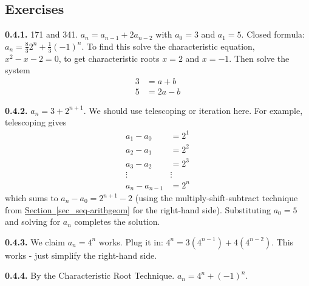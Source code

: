 \documentclass[12pt,]{book}
\theoremstyle{plain}
\theoremstyle{definition}
\theoremstyle{definition}
\theoremstyle{definition}
\numberwithin{equation}{chapter}
\newcommand{\amp}{&}
\begin{document}
\subsection*{ Exercises}
\noindent\textbf{0.4.1.} \hypertarget{p-339}{}%
171 and 341. \(a_n = a_{n-1} + 2a_{n-2}\) with \(a_0 = 3\) and \(a_1 = 5\). Closed formula: \(a_n = \frac{8}{3}2^n + \frac{1}{3}(-1)^n\).  To find this solve the characteristic equation, \(x^2 - x - 2 = 0\), to get characteristic roots \(x = 2\) and \(x=-1\).  Then solve the system%
\begin{align*}
3 \amp = a + b\\
5 \amp = 2a - b
\end{align*}
%
\par\smallskip
\noindent\textbf{0.4.2.} \hypertarget{p-341}{}%
\(a_n = 3 + 2^{n+1}\).  We should use telescoping or iteration here.  For example, telescoping gives%
\begin{align*}
a_1 - a_0 \amp = 2^1\\
a_2 - a_1 \amp = 2^2\\
a_3 - a_2 \amp = 2^3\\
\vdots\amp \vdots \\
a_n - a_{n-1} \amp = 2^n
\end{align*}
which sums to \(a_n - a_0 = 2^{n+1} - 2\) (using the multiply-shift-subtract technique from \hyperref[sec_seq-arithgeom]{Section~\ref{sec_seq-arithgeom}} for the right-hand side).  Substituting \(a_0 = 5\) and solving for \(a_n\) completes the solution.%
\par\smallskip
\noindent\textbf{0.4.3.} \hypertarget{p-343}{}%
We claim \(a_n = 4^n\) works. Plug it in: \(4^n = 3(4^{n-1}) + 4(4^{n-2})\). This works - just simplify the right-hand side.%
\par\smallskip
\noindent\textbf{0.4.4.} \hypertarget{p-345}{}%
By the Characteristic Root Technique. \(a_n = 4^n + (-1)^n\).%
\par\smallskip
\end{document}
